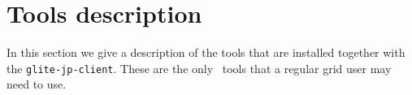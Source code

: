 \section{Tools description}

In this section we give a description of the tools that are installed
together with the \verb'glite-jp-client'. These are the only \JP\ tools that a
regular grid user may need to use.




